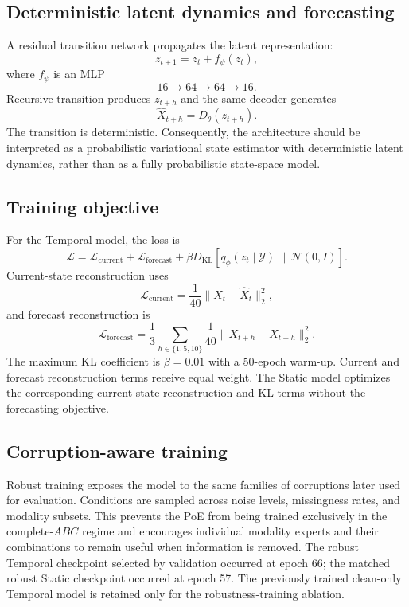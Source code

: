 \documentclass[10pt,twocolumn]{article}
\begin{document}
\subsection{Deterministic latent dynamics and forecasting}
A residual transition network propagates the latent representation:
\begin{equation}
z_{t+1}=z_t+f_{\psi}(z_t),
\end{equation}
where $f_{\psi}$ is an MLP
\begin{equation}
16\rightarrow64\rightarrow64\rightarrow16.
\end{equation}
Recursive transition produces $z_{t+h}$ and the same decoder generates
\begin{equation}
\hat X_{t+h}=D_{\theta}(z_{t+h}).
\end{equation}
The transition is deterministic. Consequently, the architecture should be interpreted as a probabilistic variational state estimator with deterministic latent dynamics, rather than as a fully probabilistic state-space model.



\subsection{Training objective}
For the Temporal model, the loss is
\begin{equation}
\mathcal{L}
=\mathcal{L}_{\mathrm{current}}
+\mathcal{L}_{\mathrm{forecast}}
+\beta D_{\mathrm{KL}}\!\left[q_{\phi}(z_t\mid\mathcal{Y})\,\|\,\mathcal{N}(0,I)\right].
\end{equation}
Current-state reconstruction uses
\begin{equation}
\mathcal{L}_{\mathrm{current}}=\frac{1}{40}\|X_t-\hat X_t\|_2^2,
\end{equation}
and forecast reconstruction is
\begin{equation}
\mathcal{L}_{\mathrm{forecast}}=
\frac{1}{3}\sum_{h\in\{1,5,10\}}
\frac{1}{40}\|X_{t+h}-\hat X_{t+h}\|_2^2.
\end{equation}
The maximum KL coefficient is $\beta=0.01$ with a 50-epoch warm-up. Current and forecast reconstruction terms receive equal weight. The Static model optimizes the corresponding current-state reconstruction and KL terms without the forecasting objective.

\subsection{Corruption-aware training}
Robust training exposes the model to the same families of corruptions later used for evaluation. Conditions are sampled across noise levels, missingness rates, and modality subsets. This prevents the PoE from being trained exclusively in the complete-$ABC$ regime and encourages individual modality experts and their combinations to remain useful when information is removed. The robust Temporal checkpoint selected by validation occurred at epoch 66; the matched robust Static checkpoint occurred at epoch 57. The previously trained clean-only Temporal model is retained only for the robustness-training ablation.
\end{document}
